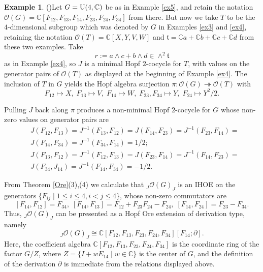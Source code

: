 \documentclass{amsart}
\numberwithin{equation}{section}
\theoremstyle{definition}
\newtheorem{example}[theorem]{Example}
\begin{document}
\begin{example}(\cite[Example 6.5]{G2})\label{ex6} 
Let $G={\rm U}(4,\mathbb{C})$ be as in Example \ref{ex5}, and retain the notation $\mathcal{O}(G) = \mathbb{C}[F_{12}, F_{13}, F_{14}, F_{23}, F_{24}, F_{34}]$ from there. But now we take $T$ to be the $4$-dimensional subgroup which was denoted by $G$ in Examples \ref{ex3} and \ref{ex4}, retaining the notation $\mathcal{O}(T) = \mathbb{C}[X,Y,V,W]$ and $\mathfrak{t} = \mathbb{C}a +\mathbb{C}b +\mathbb{C}c + \mathbb{C}d$ from these two examples. Take 
$$ r:= a\wedge c + b \wedge d \in\wedge^2 \mathfrak{t} $$
as in Example \ref{ex4}, so $J$ is a minimal Hopf $2$-cocycle for $T$, with values on the generator pairs of $\mathcal{O}(T)$ as displayed at the beginning of Example \ref{ex4}. The inclusion of $T$ in $G$ yields the Hopf algebra surjection $\pi: \mathcal{O}(G) \twoheadrightarrow \mathcal{O}(T)$ with
$$ F_{12}\mapsto X,\; F_{13}\mapsto V, \;  F_{14}\mapsto W,\; F_{23},F_{34}\mapsto Y,\; F_{24}\mapsto Y^2/2.$$

 Pulling $J$ back along $\pi$ produces a non-minimal Hopf $2$-cocycle for $G$ whose non-zero values on generator pairs are
\begin{align*} 
&J(F_{12},F_{13}) = J^{-1}(F_{13},F_{12}) = J(F_{14},F_{23})= J^{-1}(F_{23},F_{14}) = \\
&J(F_{14},F_{34}) = J^{-1}(F_{34},F_{14}) = 1/2;\\
&J(F_{13},F_{12})  = J^{-1}(F_{12},F_{13})  = J(F_{23},F_{14})= J^{-1}(F_{14},F_{23})  =\\ &J(F_{34},J_{14})  = J^{-1}(F_{14},F_{34})  =  - 1/2.
\end{align*}

\noindent From Theorem \ref{Ore}(3),(4) we calculate that ${}{}_J\mathcal{O}(G)_J$ is an IHOE on the generators $\{F_{ij} \mid 1 \leq i \leq 4, i < j \leq 4 \}$, whose non-zero commutators are 
\begin{equation}\label{full} 
[F_{14}, F_{12}] =  F_{34}, \;  [F_{14}, F_{13}]= F_{12} + F_{23}F_{24} - F_{24}, \;  [F_{14}, F_{24}] = F_{23} - F_{34}. 
\end{equation}
Thus, ${}_J\mathcal{O}(G)_J$ can be presented as a Hopf Ore extension of derivation type, namely
$$ {}_J\mathcal{O}(G)_J\cong\mathbb{C}[F_{12},F_{13},F_{23},F_{24}, F_{34}][F_{14}; \partial].$$
Here, the coefficient algebra $\mathbb{C}[F_{12},F_{13},F_{23},F_{24}, F_{34}]$ is the coordinate ring of the factor $G/Z$, where $Z = \{I + wE_{14}\mid w \in \mathbb{C}\}$ is the center of $G$, and the definition of the derivation $\partial$ is immediate from the relations displayed above.
\medskip


\end{example}
\end{document}
